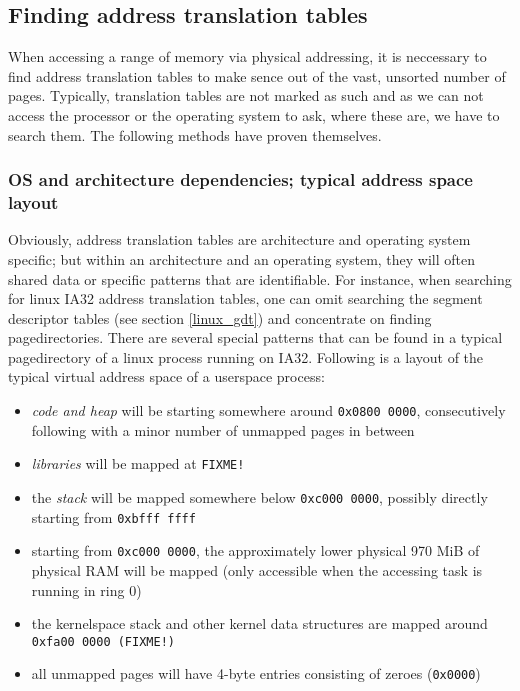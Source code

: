 \subsection{Finding address translation tables}
\label{findingATT}

When accessing a range of memory via physical addressing, it is neccessary to
find address translation tables to make sence out of the vast, unsorted number
of pages. Typically, translation tables are not marked as such and as we can not
access the processor or the operating system to ask, where these are, we have to
search them. The following methods have proven themselves.



\subsubsection{OS and architecture dependencies; typical address space layout}

Obviously, address translation tables are architecture and operating system
specific; but within an architecture and an operating system, they will often
shared data or specific patterns that are identifiable. For instance, when
searching for linux IA32 address translation tables, one can omit searching the
segment descriptor tables (see section \ref{linux_gdt}) and concentrate on
finding pagedirectories. There are several special patterns that can be found in
a typical pagedirectory of a linux process running on IA32. Following is a
layout of the typical virtual address space of a userspace process:

\begin{itemize}

	\item \emph{code and heap} will be starting somewhere around
	\texttt{0x0800~0000}, consecutively following with a minor number of
	unmapped pages in between

	\item \emph{libraries} will be mapped at \texttt{FIXME!}

	\item the \emph{stack} will be mapped somewhere below
	\texttt{0xc000~0000}, possibly directly starting from
	\texttt{0xbfff~ffff}

	\item starting from \texttt{0xc000~0000}, the approximately lower
	physical 970 MiB of physical RAM will be mapped (only accessible when
	the accessing task is running in ring 0)

	\item the kernelspace stack and other kernel data structures are mapped
	around \texttt{0xfa00~0000 (FIXME!)}

	\item all unmapped pages will have 4-byte entries consisting of zeroes
	(\texttt{0x0000})

\end{itemize}

